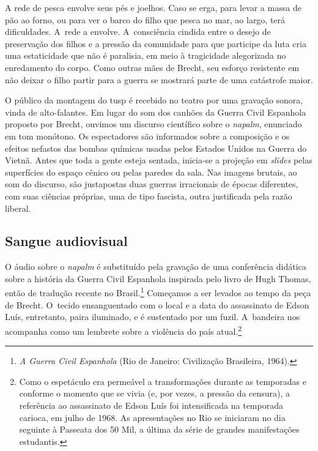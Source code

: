 

A rede de pesca envolve seus pés e joelhos. Caso se erga, para levar a
massa de pão ao forno, ou para ver o barco do filho que pesca no mar, ao
largo, terá dificuldades. A~rede a envolve. A~consciência cindida entre
o desejo de preservação dos filhos e a pressão da comunidade para que
participe da luta cria uma estaticidade que não é paralisia, em meio à
tragicidade alegorizada no enredamento do corpo. Como outras mães de
Brecht, seu esforço resistente em não deixar o filho partir para a
guerra se mostrará parte de uma catástrofe maior.

O público da montagem do {\sc tusp} é recebido no teatro por uma gravação
sonora, vinda de alto-falantes. Em lugar do som dos canhões da Guerra
Civil Espanhola proposto por Brecht, ouvimos um discurso científico
sobre o {\it napalm}, enunciado em tom monótono. Os espectadores são
informados sobre a composição e os efeitos nefastos das bombas químicas
usadas pelos Estados Unidos na Guerra do Vietnã. Antes que toda a gente
esteja sentada, inicia-se a projeção em {\it slides} pelas superfícies
do espaço cênico ou pelas paredes da sala. Nas imagens brutais, ao som
do discurso, são justapostas duas guerras irracionais de épocas
diferentes, com suas ciências próprias, uma de tipo fascista, outra
justificada pela razão liberal.

\subsection{Sangue audiovisual}

O áudio sobre o {\it napalm} é substituído pela gravação de uma
conferência didática sobre a história da Guerra Civil Espanhola
inspirada pelo livro de Hugh Thomas, então de tradução recente no
Brasil.\footnote{{\it A Guerra Civil Espanhola} (Rio de Janeiro:
  Civilização Brasileira, 1964).} Começamos a ser levados ao tempo da
peça de Brecht. O~tecido ensanguentado com o local e a data do assassinato
de Edson Luís, entretanto, paira iluminado, e é sustentado por um
fuzil. A~bandeira nos acompanha como um lembrete sobre a violência do
país atual.\footnote{Como o espetáculo era permeável a transformações
  durante as temporadas e conforme o momento que se vivia (e, por vezes,
  a pressão da censura), a referência ao assassinato de Edson Luís foi
  intensificada na temporada carioca, em julho de 1968. As apresentações
  no Rio se iniciaram no dia seguinte à Passeata dos 50 Mil, a última da
  série de grandes manifestações estudantis.}

